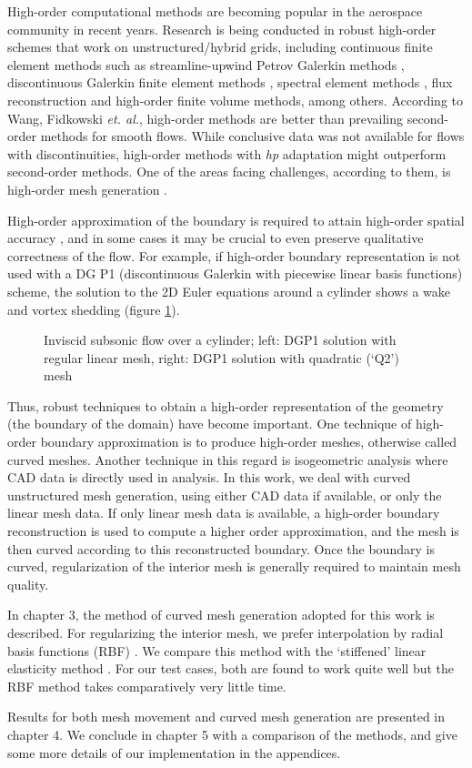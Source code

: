High-order computational methods are becoming popular in the aerospace community in recent years. Research is being conducted in robust high-order schemes that work on unstructured/hybrid grids, including continuous finite element methods such as streamline-upwind Petrov Galerkin methods \cite{appl:supg}, discontinuous Galerkin finite element methods \cite{solver, curve:hartmann, appl:mavriplis}, spectral element methods \cite{appl:spectral}, flux reconstruction \cite{appl:fr} and high-order finite volume methods, among others. According to Wang, Fidkowski \emph{et. al.}, high-order methods are better than prevailing second-order methods for smooth flows. While conclusive data was not available for flows with discontinuities, high-order methods with \emph{hp} adaptation might outperform second-order methods. One of the areas facing challenges, according to them, is high-order mesh generation \cite{highorder}. 

High-order approximation of the boundary is required to attain high-order spatial accuracy \cite{curve:geomacc}, and in some cases it may be crucial to even preserve qualitative correctness of the flow. For example, if high-order boundary representation is not used with a DG P1 (discontinuous Galerkin with piecewise linear basis functions) scheme, the solution to the 2D Euler equations around a cylinder shows a wake and vortex shedding \cite{appl:dgeuler} (figure \ref{fig:bassi}).
 \begin{figure}[!h]
 	\centering
 	\caption{Inviscid subsonic flow over a cylinder; left: DGP1 solution with regular linear mesh, right: DGP1 solution with quadratic (`Q2') mesh \cite{appl:dgeuler}}
 	\label{fig:bassi}
 \end{figure}
Thus, robust techniques to obtain a high-order representation of the geometry (the boundary of the domain) have become important.  One technique of high-order boundary approximation is to produce high-order meshes, otherwise called curved meshes. Another technique in this regard is isogeometric analysis \cite{isogeometric} where CAD data is directly used in analysis. In this work, we deal with curved unstructured mesh generation, using either CAD data if available, or only the linear mesh data. If only linear mesh data is available, a high-order boundary reconstruction is used to compute a higher order approximation, and the mesh is then curved according to this reconstructed boundary. Once the boundary is curved, regularization of the interior mesh is generally required to maintain mesh quality.

In chapter 3, the method of curved mesh generation adopted for this work is described. For regularizing the interior mesh, we prefer interpolation by radial basis functions (RBF) \cite{rbf:errorwendland}. We compare this method with the `stiffened' linear elasticity method \cite{mm:fsielast}. For our test cases, both are found to work quite well but the RBF method takes comparatively very little time.

Results for both mesh movement and curved mesh generation are presented in chapter 4. We conclude in chapter 5 with a comparison of the methods, and give some more details of our implementation in the appendices.
